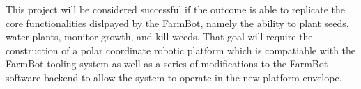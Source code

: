 This project will be considered successful if the outcome is able to replicate the core functionalities dislpayed by the FarmBot, namely the ability to plant seeds, water plants, monitor growth, and kill weeds. That goal will require the construction of a polar coordinate robotic platform which is compatiable with the FarmBot tooling system as well as a series of modifications to the FarmBot software backend to allow the system to operate in the new platform envelope.